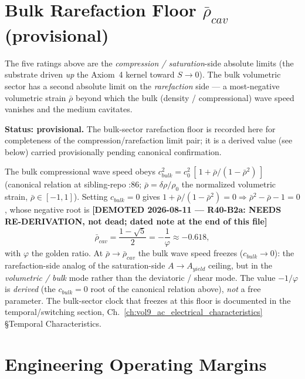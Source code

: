 \section{Bulk Rarefaction Floor $\bar{\rho}_{cav}$ (provisional)}
\label{sec:vol9_absmax_rho_cav}

The five ratings above are the \emph{compression / saturation}-side absolute limits (the substrate driven \emph{up} the Axiom~4 kernel toward $S \to 0$). The bulk volumetric sector has a second absolute limit on the \emph{rarefaction} side --- a most-negative volumetric strain $\bar{\rho}$ beyond which the bulk (density / compressional) wave speed vanishes and the medium cavitates.

\begin{warningbox}
\textbf{Status: provisional.} The bulk-sector rarefaction floor is recorded here for completeness of the compression/rarefaction limit pair; it is a derived value (see below) carried provisionally pending canonical confirmation.
\end{warningbox}

\noindent
The bulk compressional wave speed obeys $c_{bulk}^2 = c_0^2\,[\,1 + \bar{\rho}/(1 - \bar{\rho}^2)\,]$ (canonical relation at sibling-repo :86; $\bar{\rho} = \delta\rho/\rho_0$ the normalized volumetric strain, $\bar{\rho} \in [-1, 1]$). Setting $c_{bulk} = 0$ gives $1 + \bar{\rho}/(1-\bar{\rho}^2) = 0 \Rightarrow \bar{\rho}^2 - \bar{\rho} - 1 = 0$, whose negative root is \textbf{[DEMOTED 2026-08-11 --- R40-B2a: NEEDS RE-DERIVATION, not dead; dated note at the end of this file]}
\begin{equation}
\bar{\rho}_{cav} = \frac{1 - \sqrt{5}}{2} = -\frac{1}{\varphi} \approx -0.618,
\label{eq:vol9_rho_cav}
\end{equation}
with $\varphi$ the golden ratio. At $\bar{\rho} \to \bar{\rho}_{cav}$ the bulk wave speed freezes ($c_{bulk} \to 0$): the rarefaction-side analog of the saturation-side $A \to A_{yield}$ ceiling, but in the \emph{volumetric / bulk} mode rather than the deviatoric / shear mode. The value $-1/\varphi$ is \emph{derived} (the $c_{bulk} = 0$ root of the canonical relation above), \emph{not} a free parameter. The bulk-sector clock that freezes at this floor is documented in the temporal/switching section, Ch.~\ref{ch:vol9_ac_electrical_characteristics} \S Temporal Characteristics.

\section{Engineering Operating Margins}
\label{sec:vol9_absmax_margins}

